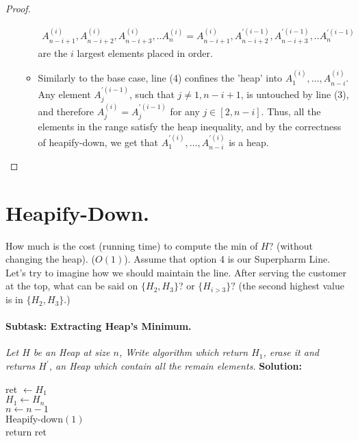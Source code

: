 \begin{proof}
\begin{enumerate}
\begin{itemize}
        \begin{equation*}
          \begin{split}
            A^{(i) }_{n-i+1},A^{(i) }_{n-i+2},A^{(i) }_{n-i+3},..A^{(i) }_{n} = A^{(i) }_{n-i+1},A^{\prime (i-1) }_{n-i+2},A^{\prime (i-1) }_{n-i+3},..A^{ \prime (i-1) }_{n}
          \end{split}
        \end{equation*}
        are the $i$ largest elements placed in order. 

       \item Similarly to the base case, line (4) confines the 'heap' into $A^{(i)}_{1}, \ldots, A^{(i)}_{n-i}$. Any element $A^{\prime (i-1)}_{j}$, such that $j \neq 1, n-i+1$, is untouched by line (3), and therefore $A^{(i)}_{j} = A^{\prime (i-1)}_{j}$ for any $j \in [2, n-i]$. Thus, all the elements in the range satisfy the heap inequality, and by the correctness of heapify-down, we get that $A^{\prime (i)}_{1}, \ldots, A^{\prime (i)}_{n-i}$ is a heap.

    \end{itemize}
\end{enumerate}
\end{proof}


\section{ Heapify-Down. }

\ifdefined\Book
How much is the cost (running time) to compute the min of $H$? (without changing the heap). ($O\left( 1 \right)$). Assume that option 4 is our Superpharm Line. Let's try to imagine how we should maintain the line. After serving the customer at the top, what can be said on $ \{ H_{2}, H_{3}\}$? or $\{H_{i>3}\}?$ (the second highest value is in $\{H_{2}, H_{3} \}$.)   
\paragraph{Subtask: Extracting Heap's Minimum.} \textit{Let $H$ be an Heap at size $n$, Write algorithm which return $H_1$, erase it and returns $H^\prime$, an Heap which contain all the remain elements.} 
\textbf{Solution:} 

\begin{algorithm}[H]
ret $\leftarrow H_{1} $ \\
$ H_{1} \leftarrow H_{n} $  \\
$ n \leftarrow n -1 $ \\
Heapify-down$\left( 1 \right)$ \\
return ret  
\end{algorithm}

